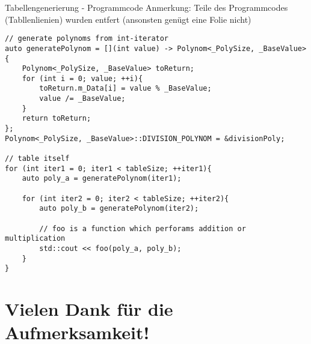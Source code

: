 \documentclass{beamer}
\begin{document}
    \begin{frame}[fragile]{Tabellengenerierung - \newline Programmcode}
	    Anmerkung: Teile des Programmcodes (Tabllenlienien) \newline wurden entfert (ansonsten genügt eine Folie nicht)
    	\begin{lstlisting}[style=numbers]
// generate polynoms from int-iterator
auto generatePolynom = [](int value) -> Polynom<_PolySize, _BaseValue>{
    Polynom<_PolySize, _BaseValue> toReturn;
    for (int i = 0; value; ++i){
        toReturn.m_Data[i] = value % _BaseValue;
        value /= _BaseValue;
    }
    return toReturn;
};
Polynom<_PolySize, _BaseValue>::DIVISION_POLYNOM = &divisionPoly;

// table itself
for (int iter1 = 0; iter1 < tableSize; ++iter1){
    auto poly_a = generatePolynom(iter1);

    for (int iter2 = 0; iter2 < tableSize; ++iter2){
        auto poly_b = generatePolynom(iter2);

        // foo is a function which perforams addition or multiplication
        std::cout << foo(poly_a, poly_b);
    }
}
\end{lstlisting}
\end{frame}


\section*{Vielen Dank für die Aufmerksamkeit!}
  
\end{document}
